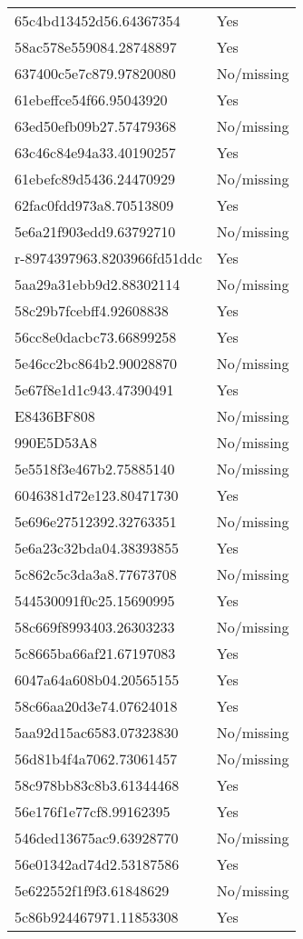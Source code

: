 \begin{tabular}{ll}
65c4bd13452d56.64367354 & Yes \\
58ac578e559084.28748897 & Yes \\
637400c5e7c879.97820080 & No/missing \\
61ebeffce54f66.95043920 & Yes \\
63ed50efb09b27.57479368 & No/missing \\
63c46c84e94a33.40190257 & Yes \\
61ebefc89d5436.24470929 & No/missing \\
62fac0fdd973a8.70513809 & Yes \\
5e6a21f903edd9.63792710 & No/missing \\
r-8974397963.8203966fd51ddc & Yes \\
5aa29a31ebb9d2.88302114 & No/missing \\
58c29b7fcebff4.92608838 & Yes \\
56cc8e0dacbc73.66899258 & Yes \\
5e46cc2bc864b2.90028870 & No/missing \\
5e67f8e1d1c943.47390491 & Yes \\
E8436BF808 & No/missing \\
990E5D53A8 & No/missing \\
5e5518f3e467b2.75885140 & No/missing \\
6046381d72e123.80471730 & Yes \\
5e696e27512392.32763351 & No/missing \\
5e6a23c32bda04.38393855 & Yes \\
5c862c5c3da3a8.77673708 & No/missing \\
544530091f0c25.15690995 & Yes \\
58c669f8993403.26303233 & No/missing \\
5c8665ba66af21.67197083 & Yes \\
6047a64a608b04.20565155 & Yes \\
58c66aa20d3e74.07624018 & Yes \\
5aa92d15ac6583.07323830 & No/missing \\
56d81b4f4a7062.73061457 & No/missing \\
58c978bb83c8b3.61344468 & Yes \\
56e176f1e77cf8.99162395 & Yes \\
546ded13675ac9.63928770 & No/missing \\
56e01342ad74d2.53187586 & Yes \\
5e622552f1f9f3.61848629 & No/missing \\
5c86b924467971.11853308 & Yes \\

\end{tabular}
